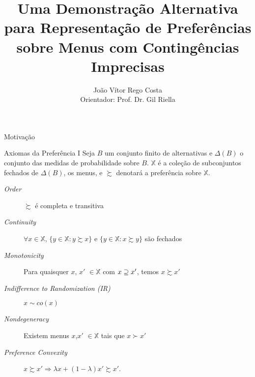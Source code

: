\documentclass[11pt]{beamer}
\author[João Vítor Rego Costa]{João Vítor Rego Costa \\ Orientador: Prof. Dr. Gil Riella}
\title[Menus com Contingências Imprecisas]{Uma Demonstração Alternativa para
Representação de Preferências sobre Menus com
Contingências Imprecisas}
\begin{document}
\begin{frame}
\titlepage
\end{frame}


\begin{frame}{Motivação}

\end{frame}

\begin{frame}{Axiomas da Preferência I}
Seja $B$ um conjunto finito de alternativas e $\Delta(B)$ o conjunto das medidas de probabilidade sobre $B$. $\mathbb{X}$ é a coleção de subconjuntos fechados de $\Delta(B)$, os menus, e $\succsim$ denotará a preferência sobre $\mathbb{X}$.

\vspace{12pt}

\begin{description}
\item [\textit{Order}] $\succsim$ é completa e transitiva
\item [\textit{Continuity}] $\forall x\in \mathbb{X}$, $\{y\in \mathbb{X}:y\succsim x\}$ e $\{y\in \mathbb{X}:x\succsim y\}$ são fechados

\item [\textit{Monotonicity}] Para quaisquer $x$, $x'$ $\in\mathbb{X}$ com $x\begin{small}\supseteq\end{small} x'$, temos $x\succsim x'$

\item [\textit{Indifference to Randomization (IR)}] $x\sim co(x)$

\item [\textit{Nondegeneracy}] Existem menus $x$,$x'$ $\in \mathbb{X}$ tais que $x\succ x'$

\item [\textit{Preference Convexity}] $x\succsim x' \Rightarrow \lambda x +(1-\lambda)x'\succsim x'$.
\end{description}
\end{frame}
\end{document}
